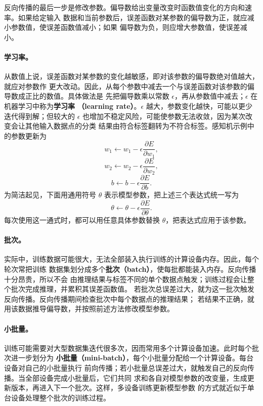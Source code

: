 反向传播的最后一步是修改参数。偏导数给出变量改变时函数值变化的方向和速率。如果给定输入
数据和当前参数后，误差函数对某参数的偏导数为正，就应减小参数值，使误差函数值减小；如果
偏导数为负，则应增大参数值，使误差减小。

\paragraph{学习率。}
从数值上说，误差函数对某参数的变化越敏感，即对该参数的偏导数绝对值越大，就应对参数作
更大改动。因此，从每个参数中减去一个与误差函数对该参数的偏导数成正比的数值。具体做法是
先把偏导数乘以常数 $\epsilon$，再从参数值中减去；$\epsilon$ 在机器学习中称为\textbf{学习率
（learning rate）}。$\epsilon$ 越大，参数变化越快，可能以更少迭代得到解；但较大的
$\epsilon$ 也增加不稳定风险，可能使参数无法收敛，因为某次改变会让其他输入数据点的分类
结果由符合标签翻转为不符合标签。感知机示例中的参数更新为
\begin{equation}
  w_1\leftarrow w_1-\epsilon\frac{\partial E}{\partial w_1},
  \label{eq:appb-14}
\end{equation}
\begin{equation}
  w_2\leftarrow w_2-\epsilon\frac{\partial E}{\partial w_2},
  \label{eq:appb-15}
\end{equation}
\begin{equation}
  b\leftarrow b-\epsilon\frac{\partial E}{\partial b}.
  \label{eq:appb-16}
\end{equation}
为简洁起见，下面用通用符号 $\theta$ 表示模型参数，把上述三个表达式统一写为
\begin{equation}
  \theta\leftarrow\theta-\epsilon\frac{\partial E}{\partial\theta}.
  \label{eq:appb-17}
\end{equation}
每次使用这一通式时，都可以用任意具体参数替换 $\theta$，把表达式应用于该参数。

\paragraph{批次。}
实际中，训练数据可能很大，无法全部装入执行训练的计算设备内存。因此，每个轮次常把训练
数据集划分成多个\textbf{批次（batch）}，使每批都能装入内存。反向传播十分昂贵，所以不会
由推理结果与标签不同的单个数据点触发；训练过程会让整个批次完成推理，并累积其误差函数值。
若批次总误差过大，就为这一批次触发反向传播。反向传播期间检查批次中每个数据点的推理结果；
若结果不正确，就用该数据推导偏导数，并按照前述方法修改模型参数。

\paragraph{小批量。}
训练可能需要对大型数据集迭代很多次，因而常用多个计算设备加速。此时每个批次进一步划分为
\textbf{小批量（mini-batch）}，每个小批量分配给一个计算设备。每台设备对自己的小批量执行
前向传播；若小批量总误差过大，就触发自己的反向传播。当全部设备完成小批量后，它们共同
求和各自对模型参数的改变量，生成更新版本，再进入下一个批次。这样，多设备训练更新模型参数
的方式就近似于单台设备处理整个批次的训练过程。


